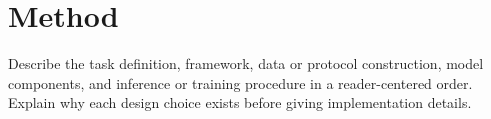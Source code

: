 \section{Method}

Describe the task definition, framework, data or protocol construction, model components, and inference or training procedure in a reader-centered order. Explain why each design choice exists before giving implementation details.
